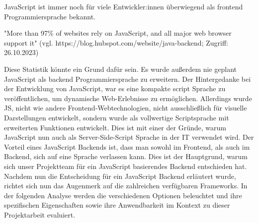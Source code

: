 JavaScript ist immer noch für viele Entwickler:innen überwiegend als frontend Programmiersprache bekannt. 

"More than 97\% of websites rely on JavaScript, and all major web browser support it"
(vgl. https://blog.hubspot.com/website/java-backend; Zugriff: 26.10.2023)

Diese Statistik könnte ein Grund dafür sein. Es wurde außerdem nie geplant JavaScript als backend Programmiersprache zu erweitern. Der Hintergedanke bei der Entwicklung von JavaScript, war es eine kompakte script Sprache zu veröffentlichen, um dynamische Web-Erlebnisse zu ermöglichen. Allerdings wurde JS, nicht wie andere Frontend-Webtechnologien, nicht ausschließlich für visuelle Darstellungen entwickelt, sondern wurde als vollwertige Scriptsprache mit erweiterten Funktionen entwickelt. Dies ist mit einer der Gründe, warum JavaScript nun auch als Server-Side-Script Sprache in der IT verwendet wird.
\newline
Der Vorteil eines JavaScript Backends ist, dass man sowohl im Frontend, als auch im Backend, sich auf eine Sprache verlassen kann. Dies ist der Hauptgrund, warum sich unser Projektteam für ein JavaScript basierendes Backend entschieden hat.
\newline
Nachdem nun die Entscheidung für ein JavaScript Backend erläutert wurde, richtet sich nun das Augenmerk auf die zahlreichen verfügbaren Frameworks. In der folgenden Analyse werden die verschiedenen Optionen beleuchtet und ihre spezifischen Eigenschaften sowie ihre Anwendbarkeit im Kontext zu dieser Projektarbeit evaluiert.
\cite{Backend_JavaScript}